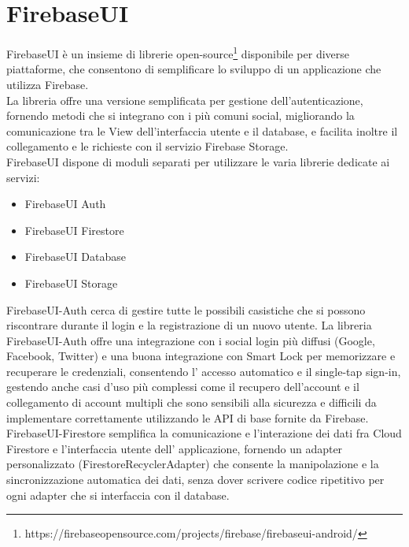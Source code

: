 \section{FirebaseUI}                 %
FirebaseUI è un insieme di librerie open-source\footnote{https://firebaseopensource.com/projects/firebase/firebaseui-android/} disponibile per diverse piattaforme, che consentono di semplificare lo sviluppo di un applicazione che utilizza Firebase.\\
La libreria offre una versione semplificata per gestione dell'autenticazione, fornendo metodi che si integrano con i più comuni social, migliorando la comunicazione tra le View dell'interfaccia utente e il database, e facilita inoltre il collegamento e le richieste con il servizio Firebase Storage.\\
FirebaseUI dispone di moduli separati per utilizzare le varia librerie dedicate ai servizi:
\begin{itemize}
  \item  FirebaseUI Auth
  \item  FirebaseUI Firestore
  \item  FirebaseUI Database
  \item  FirebaseUI Storage
\end{itemize}


FirebaseUI-Auth cerca di gestire tutte le possibili casistiche che si possono riscontrare durante il login e la registrazione di un nuovo utente.
La libreria FirebaseUI-Auth offre una integrazione con i social login più diffusi (Google, Facebook, Twitter) e una buona integrazione con Smart Lock per memorizzare e recuperare le credenziali, consentendo l' accesso automatico e il single-tap sign-in, gestendo anche casi d'uso più complessi come il recupero dell'account e il collegamento di account multipli che sono sensibili alla sicurezza e difficili da implementare correttamente utilizzando le API di base fornite da Firebase.\\
FirebaseUI-Firestore semplifica la comunicazione e l'interazione dei dati fra Cloud Firestore e l'interfaccia utente dell' applicazione, fornendo un adapter personalizzato (FirestoreRecyclerAdapter) che consente la manipolazione e la sincronizzazione automatica dei dati, senza dover scrivere codice ripetitivo per ogni adapter che si interfaccia con il database.
\clearpage{\pagestyle{empty}\cleardoublepage}
